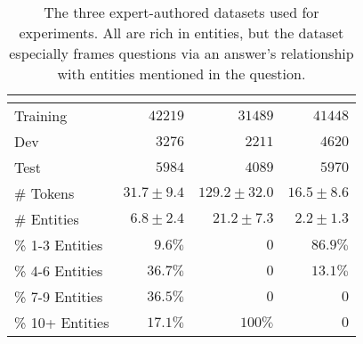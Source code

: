 \begin{table}[t]
  \centering
  \begin{tabular}{lrrr}
      & \textbf{\qblink{}} & \textbf{\qanta{}} & \textbf{\triviaqa{}}  \\ \toprule
    Training &$42219$ & $31489$ & $41448$\\ 
    Dev &$3276$ & $2211$ & $4620$\\ 
    Test &$5984$ & $4089$ & $5970$\\  \midrule
    \# Tokens  &$31.7 \pm9.4$ & $129.2\pm 32.0$ & $16.5\pm 8.6$ \\
    \# Entities &$6.8\pm2.4$ & $21.2\pm7.3$ & $2.2\pm1.3$\\ \midrule
    \% 1-3 Entities & $9.6\%$& $0$& $86.9\%$\\
    \% 4-6 Entities & $36.7\%$& $0$& $13.1\%$\\
    \% 7-9 Entities & $36.5\%$& $0$& $0$\\
    \% 10+ Entities & $17.1\%$& $100\%$& $0$ \\
  \bottomrule
  \end{tabular}
  \caption{The three expert-authored datasets used for experiments.
    All are rich in entities, but the \qanta{} dataset especially
    frames questions via an answer's relationship with entities
    mentioned in the question.}
  \label{tab:data}
  
\end{table}
